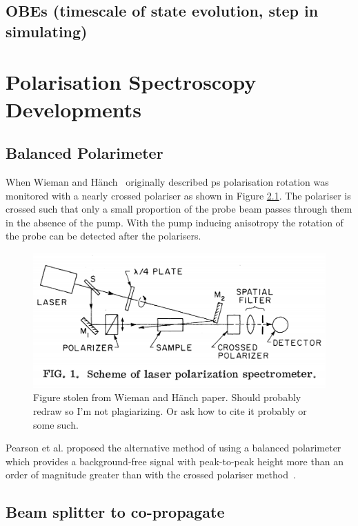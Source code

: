\section{OBEs (timescale of state evolution, step in simulating)}

\chapter{Polarisation Spectroscopy Developments}
\section{Balanced Polarimeter}
When Wieman and H\"anch~\cite{wieman_doppler-free_1976} originally described \gls{ps} polarisation rotation was monitored with a nearly crossed polariser as shown in Figure \ref{figure:wieman_doppler-free_schematic}.
The polariser is crossed such that only a small proportion of the probe beam passes through them in the absence of the pump.
With the pump inducing anisotropy the rotation of the probe can be detected after the polarisers.

\begin{figure}
\includegraphics[width=\linewidth]{part1/Figs/wieman_doppler-free_schematic.png}
\caption{Figure stolen from Wieman and H\"anch paper.
Should probably redraw so I'm not plagiarizing.
Or ask how to cite it probably or some such.}
\label{figure:wieman_doppler-free_schematic}
\end{figure}

Pearson et al. proposed the alternative method of using a balanced polarimeter which provides a background-free signal with peak-to-peak height more than an order of magnitude greater than with the crossed polariser method~\cite{pearman_polarization_2002}.

\section{Beam splitter to co-propagate}

